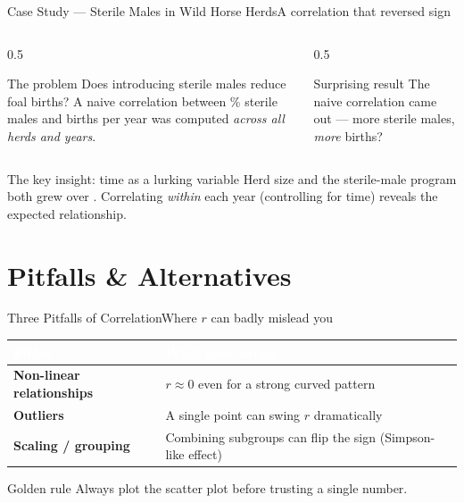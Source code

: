 \documentclass[aspectratio=169,11pt]{beamer}
\begin{document}
\begin{frame}{Case Study — Sterile Males in Wild Horse Herds}{A correlation that reversed sign}
  \begin{columns}[T]
    \begin{column}{0.5\textwidth}
      \begin{block}{The problem}
        \small Does introducing sterile males reduce foal births? A naive
        correlation between \% sterile males and births per year was
        computed \emph{across all herds and years}.
      \end{block}
    \end{column}
    \begin{column}{0.5\textwidth}
      \begin{alertblock}{Surprising result}
        \small The naive correlation came out  — more
        sterile males, \emph{more} births?
      \end{alertblock}
    \end{column}
  \end{columns}
  \vfill
  \begin{exampleblock}{The key insight: time as a lurking variable}
    \small Herd size and the sterile-male program both grew over
    . Correlating \emph{within} each year (controlling for
    time) reveals the expected  relationship.
  \end{exampleblock}
\end{frame}

\section{Pitfalls \& Alternatives}

\begin{frame}{Three Pitfalls of Correlation}{Where $r$ can badly mislead you}
  \small
  \renewcommand{\arraystretch}{1.3}
  \begin{center}
  \begin{tabularx}{\textwidth}{@{}>{\bfseries}l >{\raggedright\arraybackslash}X@{}}
    \toprule
    \rowcolor{PrimaryDark}
    \textcolor{white}{Pitfall} & \textcolor{white}{What goes wrong} \\
    \midrule
    Non-linear relationships & $r\approx 0$ even for a strong curved pattern \\
    \rowcolor{PrimaryLight!25}
    Outliers & A single point can swing $r$ dramatically \\
    Scaling / grouping & Combining subgroups can flip the sign (Simpson-like effect) \\
    \bottomrule
  \end{tabularx}
  \end{center}
  \begin{alertblock}{Golden rule}
    \small Always plot the scatter plot before trusting a single number.
  \end{alertblock}
\end{frame}
\end{document}
